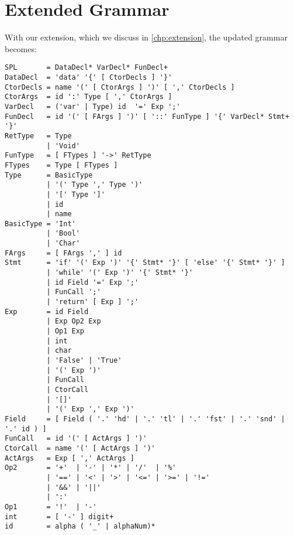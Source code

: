 \documentclass[dvipsnames]{report}
\begin{document}
\chapter{Extended Grammar}

With our extension, which we discuss in \cref{chp:extension}, the updated grammar becomes:

\begin{verbatim}
SPL       = DataDecl* VarDecl* FunDecl+
DataDecl  = 'data' '{' [ CtorDecls ] '}'
CtorDecls = name '(' [ CtorArgs ] ')' [ ',' CtorDecls ]
CtorArgs  = id ':' Type [ ',' CtorArgs ]
VarDecl   = ('var' | Type) id  '=' Exp ';'
FunDecl   = id '(' [ FArgs ] ')' [ '::' FunType ] '{' VarDecl* Stmt+ '}'
RetType   = Type
          | 'Void'
FunType   = [ FTypes ] '->' RetType
FTypes    = Type [ FTypes ]
Type      = BasicType
          | '(' Type ',' Type ')'
          | '[' Type ']'
          | id
          | name
BasicType = 'Int'
          | 'Bool'
          | 'Char'
FArgs     = [ FArgs ',' ] id
Stmt      = 'if' '(' Exp ')' '{' Stmt* '}' [ 'else' '{' Stmt* '}' ]
          | 'while' '(' Exp ')' '{' Stmt* '}'
          | id Field '=' Exp ';'
          | FunCall ';'
          | 'return' [ Exp ] ';'
Exp       = id Field
          | Exp Op2 Exp
          | Op1 Exp
          | int
          | char
          | 'False' | 'True'
          | '(' Exp ')'
          | FunCall
          | CtorCall
          | '[]'
          | '(' Exp ',' Exp ')'
Field     = [ Field ( '.' 'hd' | '.' 'tl' | '.' 'fst' | '.' 'snd' | '.' id ) ]
FunCall   = id '(' [ ActArgs ] ')'
CtorCall  = name '(' [ ActArgs ] ')'
ActArgs   = Exp [ ',' ActArgs ]
Op2       = '+'  | '-' | '*' | '/'  | '%'
          | '==' | '<' | '>' | '<=' | '>=' | '!='
          | '&&' | '||'
          | ':'
Op1       = '!'  | '-'
int       = [ '-' ] digit+
id        = alpha ( '_' | alphaNum)*
\end{verbatim}
\end{document}
